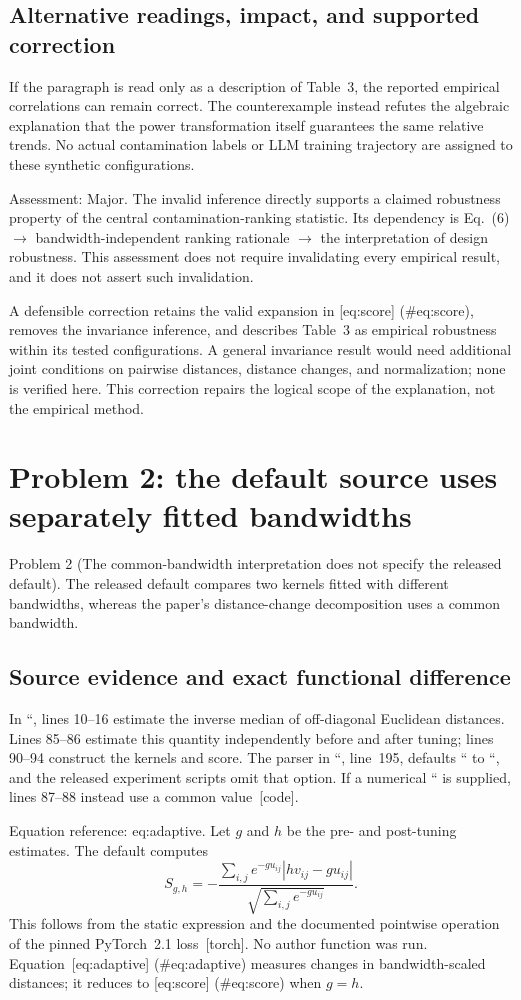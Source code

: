 \documentclass[10pt]{article}
\begin{document}
\subsection*{Alternative readings, impact, and supported correction}
If the paragraph is read only as a description of Table 3, the reported empirical correlations can remain correct. The counterexample instead refutes the algebraic explanation that the power transformation itself guarantees the same relative trends. No actual contamination labels or LLM training trajectory are assigned to these synthetic configurations.\par
Assessment: Major. The invalid inference directly supports a claimed robustness property of the central contamination-ranking statistic. Its dependency is Eq. (6) \(\rightarrow\) bandwidth-independent ranking rationale \(\rightarrow\) the interpretation of design robustness. This assessment does not require invalidating every empirical result, and it does not assert such invalidation.\par
A defensible correction retains the valid expansion in [eq:score] (\#eq:score), removes the invariance inference, and describes Table 3 as empirical robustness within its tested configurations. A general invariance result would need additional joint conditions on pairwise distances, distance changes, and normalization; none is verified here. This correction repairs the logical scope of the explanation, not the empirical method.\par
\section*{Problem 2: the default source uses separately fitted bandwidths}
Problem 2 (The common-bandwidth interpretation does not specify the released default).  The released default compares two kernels fitted with different bandwidths, whereas the paper’s distance-change decomposition uses a common bandwidth.\par
\subsection*{Source evidence and exact functional difference}
In ``, lines 10–16 estimate the inverse median of off-diagonal Euclidean distances. Lines 85–86 estimate this quantity independently before and after tuning; lines 90–94 construct the kernels and score. The parser in ``, line 195, defaults `` to ``, and the released experiment scripts omit that option. If a numerical `` is supplied, lines 87–88 instead use a common value [code].\par
Equation reference: eq:adaptive. Let \(g\) and \(h\) be the pre- and post-tuning estimates. The default computes \[
S_{g,h}
=-\frac{\sum_{i,j}e^{-g u_{ij}}\left|h v_{ij}-g u_{ij}\right|}
        {\sqrt{\sum_{i,j}e^{-g u_{ij}}}}.\] This follows from the static expression and the documented pointwise operation of the pinned PyTorch 2.1 loss [torch]. No author function was run. Equation [eq:adaptive] (\#eq:adaptive) measures changes in bandwidth-scaled distances; it reduces to [eq:score] (\#eq:score) when \(g=h\).\par
\end{document}
